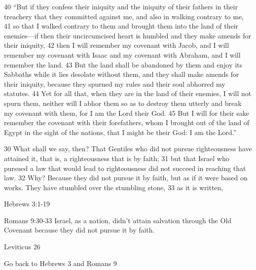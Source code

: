 \begin{bible}
40 ``But if they confess their iniquity and the iniquity of their fathers in their treachery that they committed against me, and also in walking contrary to me, 41 so that I walked contrary to them and brought them into the land of their enemies—if then their uncircumcised heart is humbled and they make amends for their iniquity, 42 then I will remember my covenant with Jacob, and I will remember my covenant with Isaac and my covenant with Abraham, and I will remember the land. 43 But the land shall be abandoned by them and enjoy its Sabbaths while it lies desolate without them, and they shall make amends for their iniquity, because they spurned my rules and their soul abhorred my statutes. 44 Yet for all that, when they are in the land of their enemies, I will not spurn them, neither will I abhor them so as to destroy them utterly and break my covenant with them, for I am the Lord their God. 45 But I will for their sake remember the covenant with their forefathers, whom I brought out of the land of Egypt in the sight of the nations, that I might be their God: I am the Lord.''


30 What shall we say, then? That Gentiles who did not pursue righteousness have attained it, that is, a righteousness that is by faith; 31 but that Israel who pursued a law that would lead to righteousness did not succeed in reaching that law. 32 Why? Because they did not pursue it by faith, but as if it were based on works. They have stumbled over the stumbling stone, 33 as it is written,

\end{bible}

\begin{discussion}



Hebrews 3:1-19

Romans 9:30-33  Israel, as a nation,  didn't attain salvation through the Old Covenant because they did not pursue it by faith.


Leviticus 26


Go back to Hebrews 3 and Romans 9

\end{discussion}